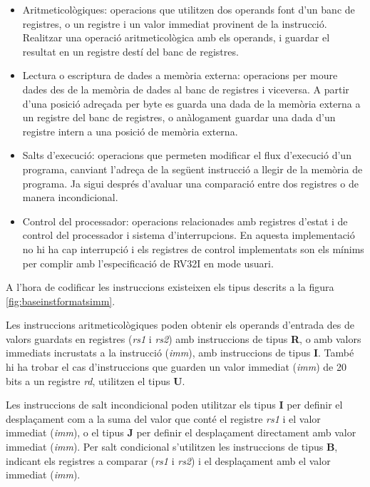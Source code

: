 \documentclass[10pt,a4paper,twocolumn,twoside]{article}
\begin{document}
    \begin{itemize}
        \item Aritmeticològiques: operacions que utilitzen dos operands font d'un banc de registres, o un registre i un valor immediat provinent de la instrucció. Realitzar una operació aritmeticològica amb els operands, i guardar el resultat en un registre destí del banc de registres.
        \item Lectura o escriptura de dades a memòria externa: operacions per moure dades des de la memòria de dades al banc de registres i viceversa. A partir d'una posició adreçada per byte es guarda una dada de la memòria externa a un registre del banc de registres, o anàlogament guardar una dada d'un registre intern a una posició de memòria externa.
        \item Salts d'execució: operacions que permeten modificar el flux d’execució d’un programa, canviant l’adreça de la següent instrucció a llegir de la memòria de programa. Ja sigui després d'avaluar una comparació entre dos registres o de manera incondicional.
        \item Control del processador: operacions relacionades amb registres d'estat i de control del processador i sistema d'interrupcions. En aquesta implementació no hi ha cap interrupció i els registres de control implementats son els mínims per complir amb l'especificació de RV32I en mode usuari.
    \end{itemize}
    
    A l'hora de codificar les instruccions existeixen els tipus descrits a la figura \ref{fig:baseinstformatsimm}.
    
    Les instruccions aritmeticològiques poden obtenir els operands d'entrada des de valors guardats en registres (\textit{rs1} i\textit{ rs2}) amb instruccions de tipus \textbf{R}, o amb valors immediats incrustats a la instrucció (\textit{imm}), amb instruccions de tipus \textbf{I}. També hi ha trobar el cas d'instruccions que guarden un valor immediat (\textit{imm}) de 20 bits a un registre \textit{rd}, utilitzen el tipus \textbf{U}.
    
    Les instruccions de salt incondicional poden utilitzar els tipus \textbf{I} per definir el desplaçament com a la suma del valor que conté el registre \textit{rs1} i el valor immediat (\textit{imm}), o el tipus \textbf{J} per definir el desplaçament directament amb valor immediat (\textit{imm}).
    Per salt condicional s'utilitzen les instruccions de tipus \textbf{B}, indicant els registres a comparar (\textit{rs1} i \textit{rs2}) i el desplaçament amb el valor immediat (\textit{imm}).
    
\end{document}

